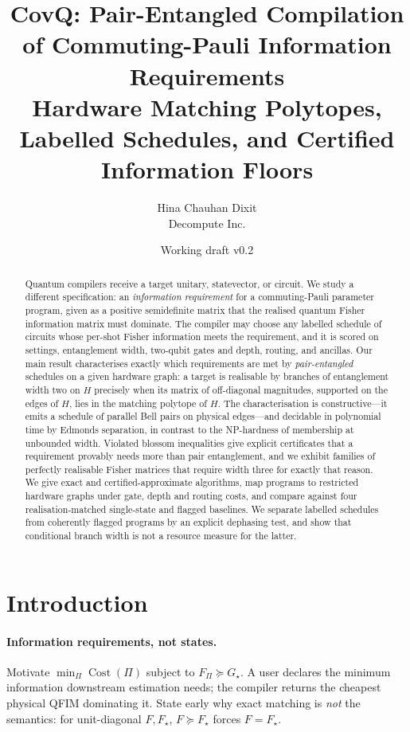 \documentclass[11pt]{article}
\title{CovQ: Pair-Entangled Compilation of Commuting-Pauli Information
Requirements\\\large Hardware Matching Polytopes, Labelled Schedules, and Certified
Information Floors}
\author{Hina Chauhan Dixit\\Decompute Inc.}
\date{Working draft v0.2}
\begin{document}
\maketitle

\begin{abstract}
Quantum compilers receive a target unitary, statevector, or circuit. We study a different
specification: an \emph{information requirement} for a commuting-Pauli parameter program,
given as a positive semidefinite matrix that the realised quantum Fisher information matrix
must dominate. The compiler may choose any labelled schedule of circuits whose per-shot
Fisher information meets the requirement, and it is scored on settings, entanglement width,
two-qubit gates and depth, routing, and ancillas. Our main result characterises exactly which
requirements are met by \emph{pair-entangled} schedules on a given hardware graph: a target
is realisable by branches of entanglement width two on $H$ precisely when its matrix of
off-diagonal magnitudes, supported on the edges of $H$, lies in the matching polytope of $H$.
The characterisation is constructive---it emits a schedule of parallel Bell pairs on physical
edges---and decidable in polynomial time by Edmonds separation, in contrast to the
NP-hardness of membership at unbounded width. Violated blossom inequalities give explicit
certificates that a requirement provably needs more than pair entanglement, and we exhibit
families of perfectly realisable Fisher matrices that require width three for exactly that
reason. We give exact and certified-approximate algorithms, map programs to restricted
hardware graphs under gate, depth and routing costs, and compare against four
realisation-matched single-state and flagged baselines. We separate labelled schedules from
coherently flagged programs by an explicit dephasing test, and show that conditional branch
width is not a resource measure for the latter.
\end{abstract}

\section{Introduction}
\paragraph{Information requirements, not states.}
Motivate $\min_\Pi \operatorname{Cost}(\Pi)$ subject to $F_\Pi\succeq G_\star$. A user
declares the minimum information downstream estimation needs; the compiler returns the
cheapest physical QFIM dominating it. State early why exact matching is \emph{not} the
semantics: for unit-diagonal $F,F_\star$, $F\succeq F_\star$ forces $F=F_\star$.
\end{document}
